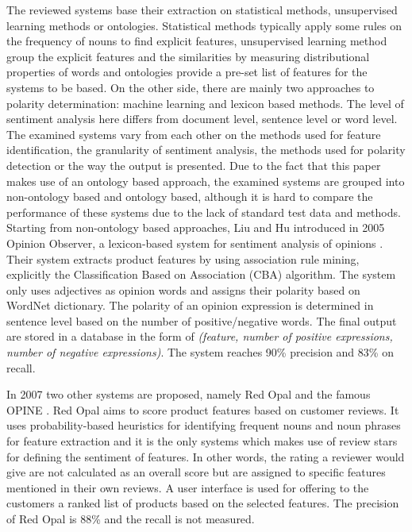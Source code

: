 The reviewed systems base their extraction on statistical methods, unsupervised learning methods or ontologies. Statistical methods typically apply some rules on the frequency of nouns to find explicit features,  unsupervised learning method group the explicit features and the similarities by measuring distributional properties of words and ontologies provide a pre-set list of features for the systems to be based.
On the other side, there are mainly two approaches to polarity determination: machine learning and lexicon based methods. The level of sentiment analysis here differs from document level, sentence level or word level. The examined systems vary from each other on the methods used for feature identification, the granularity of sentiment analysis, the methods used for polarity detection or the way the output is presented. Due to the fact that this paper makes use of an ontology based approach, the examined systems are grouped into non-ontology based and ontology based, although it is hard to compare the performance of these systems due to the lack of standard test data and methods.
Starting from non-ontology based approaches,  Liu and Hu introduced in 2005 Opinion Observer, a lexicon-based system for sentiment analysis of opinions \cite{liu2005opinion,hu2004mining}. Their system extracts product features by using association rule mining, explicitly the Classification Based on Association (CBA) algorithm. The system only uses adjectives as opinion words and assigns their polarity based on WordNet dictionary. The polarity of an opinion expression is determined in sentence level based on the number of positive/negative words. The final output are stored in a database in the form of \textit{(feature, number of positive expressions, number of negative expressions)}. The system reaches 90\% precision and 83\% on recall. 

In 2007 two other systems are proposed, namely Red Opal \cite{scaffidi2007red} and the famous OPINE \cite{popescu2007extracting}. Red Opal aims to score product features based on customer reviews. It uses probability-based heuristics for identifying frequent nouns and noun phrases for feature extraction and it is the only systems which makes use of review stars for defining the sentiment of features. In other words, the rating a reviewer would give are not calculated as an overall score but are assigned to specific features mentioned in their own reviews. A user interface is used for offering to the customers a ranked list of products based on the selected features. The precision of Red Opal is 88\% and the recall is not measured. 

